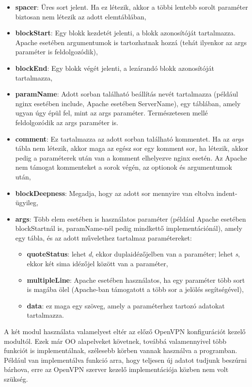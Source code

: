 \begin{itemize}
    \item \textbf{spacer}: Üres sort jelent. Ha ez létezik, akkor a többi lentebb sorolt paraméter biztosan nem létezik az adott elemtáblában,
    \item \textbf{blockStart}: Egy blokk kezdetét jelenti, a blokk azonosítóját tartalmazza. Apache esetében argumentumok is tartozhatnak hozzá (tehát ilyenkor az args paraméter is feldolgozódik),
    \item \textbf{blockEnd}: Egy blokk végét jelenti, a lezárandó blokk azonosítóját tartalmazza,
    \item \textbf{paramName}: Adott sorban található beállítás nevét tartalmazza (például nginx esetében include, Apache esetében ServerName), egy táblában, amely ugyan úgy épül fel, mint az args paraméter. Természetesen mellé feldolgozódik az args paraméter is.
    \item \textbf{comment}: Ez tartalmazza az adott sorban található kommentet. Ha az \textit{args} tábla nem létezik, akkor maga az egész sor egy komment sor, ha létezik, akkor pedig a paraméterek után van a komment elhelyezve nginx esetén. Az Apache nem támogat kommenteket a sorok végén, az optionok és argumentumok után,
    \item \textbf{blockDeepness}: Megadja, hogy az adott sor mennyire van eltolva indent-ügyileg,
    \item \textbf{args}: Több elem esetében is használatos paraméter (például Apache esetében blockStartnál is, paramName-nél pedig mindkettő implementációnál), amely egy tábla, és az adott művelethez tartalmaz paramétereket:
        \begin{itemize}
            \item \textbf{quoteStatus}: lehet \textit{d}, ekkor duplaidézőjelben van a paraméter; lehet \textit{s}, ekkor két sima idézőjel között van a paraméter,
            \item \textbf{multipleLine}: Apache esetében használatos, ha egy paraméter több sort is magába ölel (Apache-ban támogatott a több sor a \texttt{\detokenize{\\}} jelölés segítségével),
            \item \textbf{data}: ez maga egy szöveg, amely a paraméterhez tartozó adatokat tartalmazza.
        \end{itemize}
\end{itemize}

A két modul használata valamelyest eltér az előző OpenVPN konfigurációt kezelő modultól. Ezek már OO alapelveket követnek, továbbá valamennyivel több funkciót is implementálnak, szélesebb körben vannak használva a programban. Például van implementálva funkció arra, hogy teljesen új adatot tudjunk beszúrni bárhova, erre az OpenVPN szerver kezelő implementációja közben nem volt szükség.

